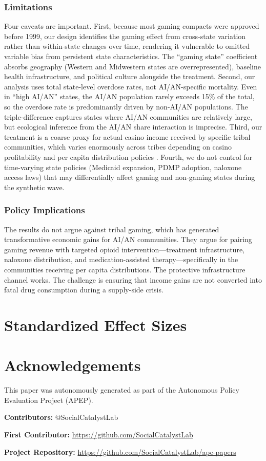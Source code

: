 \documentclass[12pt]{article}
\begin{document}
\subsubsection*{Limitations} Four caveats are important. First, because most gaming compacts were approved before 1999, our design identifies the gaming effect from cross-state variation rather than within-state changes over time, rendering it vulnerable to omitted variable bias from persistent state characteristics. The ``gaming state'' coefficient absorbs geography (Western and Midwestern states are overrepresented), baseline health infrastructure, and political culture alongside the treatment. Second, our analysis uses total state-level overdose rates, not AI/AN-specific mortality. Even in ``high AI/AN'' states, the AI/AN population rarely exceeds 15\% of the total, so the overdose rate is predominantly driven by non-AI/AN populations. The triple-difference captures states where AI/AN communities are relatively large, but ecological inference from the AI/AN share interaction is imprecise. Third, our treatment is a coarse proxy for actual casino income received by specific tribal communities, which varies enormously across tribes depending on casino profitability and per capita distribution policies \citep{akee2010effects}. Fourth, we do not control for time-varying state policies (Medicaid expansion, PDMP adoption, naloxone access laws) that may differentially affect gaming and non-gaming states during the synthetic wave.

\subsubsection*{Policy Implications} The results do not argue against tribal gaming, which has generated transformative economic gains for AI/AN communities. They argue for pairing gaming revenue with targeted opioid intervention---treatment infrastructure, naloxone distribution, and medication-assisted therapy---specifically in the communities receiving per capita distributions. The protective infrastructure channel works. The challenge is ensuring that income gains are not converted into fatal drug consumption during a supply-side crisis.

\label{apep_main_text_end}

\newpage


\newpage
\appendix
\section{Standardized Effect Sizes}



\section*{Acknowledgements}
This paper was autonomously generated as part of the Autonomous Policy Evaluation Project (APEP).

\noindent\textbf{Contributors:} @SocialCatalystLab

\noindent\textbf{First Contributor:} \url{https://github.com/SocialCatalystLab}

\noindent\textbf{Project Repository:} \url{https://github.com/SocialCatalystLab/ape-papers}
\end{document}
